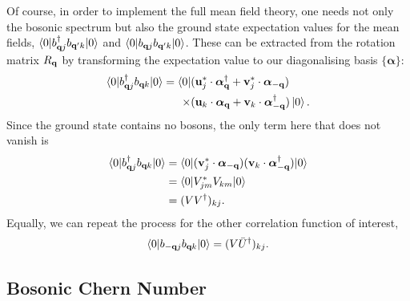 Of course, in order to implement the full mean field theory, one needs not only the bosonic spectrum but also the ground state expectation values for the mean fields, $\braket{0 |b^\dag_{\textbf q j} b_{\textbf q' k}  | 0} $ and $\braket{0 |b_{\textbf q j} b_{\textbf q' k}  | 0} $. These can be extracted from the rotation matrix $R_{\textbf q}$ by transforming the expectation value to our diagonalising basis $\{\bm \alpha\}$:
\begin{align}\begin{split}
    \braket{0 |b^\dag_{\textbf q j} b_{\textbf q k}  | 0} 
    = \bra{0}
    &(
    \textbf u^*_{j} \cdot \bm \alpha_{\textbf q}^\dag + 
    \textbf v^*_{j} \cdot \bm \alpha_{-\textbf q}
    ) \\ 
    \times
    &(
    \textbf u_k \cdot  \bm \alpha_{\textbf q} +
    \textbf v_k \cdot \bm \alpha^\dag_{-\textbf q}
    ) 
    \ket{0}.
\end{split}
\end{align}
Since the ground state contains no bosons, the only term here that does not vanish is
\begin{align}
    \braket{0 |b^\dag_{\textbf q j} b_{\textbf q k}  | 0} 
    & =
    \braket{0 |
    (\textbf v^*_{j} \cdot \bm \alpha_{-\textbf q} )
    (\textbf v_k \cdot \bm \alpha^\dag_{-\textbf q})
    | 0} \\
    & = \braket{0 |
    V^*_{jm}V_{km}
    | 0} \\
    &= (V V^\dag) _{kj}.\label{eqn:P}
\end{align}
Equally, we can repeat the process for the other correlation function of interest,
\begin{align}
    \braket{0 |b_{-\textbf q j} b_{\textbf q k}  | 0} 
   = (V \bar U^\dag)_{kj}.\label{eqn:Q}
\end{align}

\subsection{Bosonic Chern Number}\label{apx:chern_number}

